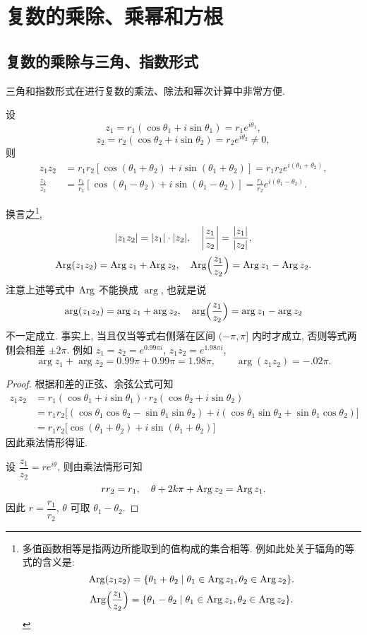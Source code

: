 \section{复数的乘除、乘幂和方根}

\subsection{复数的乘除与三角、指数形式}

三角和指数形式在进行复数的乘法、除法和幂次计算中非常方便.

\begin{theorem}
  设
  \[z_1=r_1(\cos\theta_1+i\sin\theta_1)=r_1e^{i\theta_1},\]
  \[z_2=r_2(\cos\theta_2+i\sin\theta_2)=r_2e^{i\theta_2}\neq 0,\]
  则
  \begin{align*}
    z_1z_2&=r_1r_2[\cos(\theta_1+\theta_2)+i\sin(\theta_1+\theta_2)]=r_1r_2e^{i(\theta_1+\theta_2)},\\
    \frac{z_1}{z_2}&=\frac{r_1}{r_2}[\cos(\theta_1-\theta_2)+i\sin(\theta_1-\theta_2)]=\frac{r_1}{r_2}e^{i(\theta_1-\theta_2)}.
  \end{align*}
\end{theorem}

换言之\footnote{多值函数相等是指两边所能取到的值构成的集合相等.
例如此处关于辐角的等式的含义是:
  \[\operatorname{Arg}(z_1z_2)=\{\theta_1+\theta_2\mid\theta_1\in\operatorname{Arg} z_1,\theta_2\in\operatorname{Arg} z_2\}.\]
  \[\operatorname{Arg}\Bigl(\frac{z_1}{z_2}\Bigr)=\{\theta_1-\theta_2\mid\theta_1\in\operatorname{Arg} z_1,\theta_2\in\operatorname{Arg} z_2\}.\]
},
  \[|z_1z_2|=|z_1|\cdot|z_2|,\quad\left|\frac{z_1}{z_2}\right|=\frac{|z_1|}{|z_2|},\]
  \[\operatorname{Arg}(z_1z_2)=\operatorname{Arg} z_1+\operatorname{Arg} z_2,\quad
  \operatorname{Arg}\Bigl(\frac{z_1}{z_2}\Bigr)=\operatorname{Arg} z_1-\operatorname{Arg} z_2.\]
注意上述等式中 $\operatorname{Arg}$ 不能换成 $\arg$, 也就是说
  \[\arg(z_1z_2)=\arg z_1+\arg z_2,\quad
  \arg\Bigl(\frac{z_1}{z_2}\Bigr)=\arg z_1-\arg z_2\]
\alert{不一定成立}.
事实上, 当且仅当等式右侧落在区间 $(-\pi,\pi]$ 内时才成立, 否则等式两侧会相差 $\pm2\pi$.
例如 $z_1=z_2=e^{0.99\pi i}$, $z_1z_2=e^{1.98\pi i}$,
\[\arg z_1+\arg z_2=0.99\pi+0.99\pi=1.98\pi,\qquad
\arg(z_1z_2)=-.02\pi.\]

\begin{proof}
  根据和差的正弦、余弦公式可知
  \begin{align*}
    z_1z_2&=r_1(\cos\theta_1+i\sin\theta_1)\cdot
    r_2(\cos\theta_2+i\sin\theta_2)\\
    &{=r_1r_2\bigl[(\cos\theta_1\cos\theta_2-\sin\theta_1\sin\theta_2)
    +i(\cos\theta_1\sin\theta_2+\sin\theta_1\cos\theta_2)\bigr]}\\
    &{=r_1r_2\bigl[\cos(\theta_1+\theta_2)+i\sin(\theta_1+\theta_2)\bigr]}
  \end{align*}
  因此乘法情形得证.

  设 $\dfrac{z_1}{z_2}=re^{i\theta}$, 则由乘法情形可知
    \[rr_2=r_1,\quad \theta+2k\pi+\operatorname{Arg} z_2=\operatorname{Arg} z_1.\]
  因此 $r=\dfrac{r_1}{r_2}$, $\theta$ 可取 $\theta_1-\theta_2$.
\end{proof}


